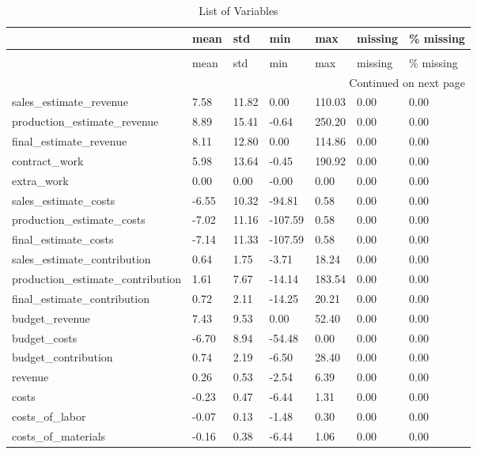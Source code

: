 \begin{landscape}\begin{longtable}[h!]{lllllll}
\caption{List of Variables} \label{eda_1} \\
\toprule
 & mean & std & min & max & missing & \% missing \\
\midrule
\endfirsthead
\caption[]{List of Variables} \\
\toprule
 & mean & std & min & max & missing & \% missing \\
\midrule
\endhead
\midrule
\multicolumn{7}{r}{Continued on next page} \\
\midrule
\endfoot
\bottomrule
\endlastfoot
sales_estimate_revenue & 7.58 & 11.82 & 0.00 & 110.03 & 0.00 & 0.00 \\
production_estimate_revenue & 8.89 & 15.41 & -0.64 & 250.20 & 0.00 & 0.00 \\
final_estimate_revenue & 8.11 & 12.80 & 0.00 & 114.86 & 0.00 & 0.00 \\
contract_work & 5.98 & 13.64 & -0.45 & 190.92 & 0.00 & 0.00 \\
extra_work & 0.00 & 0.00 & -0.00 & 0.00 & 0.00 & 0.00 \\
sales_estimate_costs & -6.55 & 10.32 & -94.81 & 0.58 & 0.00 & 0.00 \\
production_estimate_costs & -7.02 & 11.16 & -107.59 & 0.58 & 0.00 & 0.00 \\
final_estimate_costs & -7.14 & 11.33 & -107.59 & 0.58 & 0.00 & 0.00 \\
sales_estimate_contribution & 0.64 & 1.75 & -3.71 & 18.24 & 0.00 & 0.00 \\
production_estimate_contribution & 1.61 & 7.67 & -14.14 & 183.54 & 0.00 & 0.00 \\
final_estimate_contribution & 0.72 & 2.11 & -14.25 & 20.21 & 0.00 & 0.00 \\
budget_revenue & 7.43 & 9.53 & 0.00 & 52.40 & 0.00 & 0.00 \\
budget_costs & -6.70 & 8.94 & -54.48 & 0.00 & 0.00 & 0.00 \\
budget_contribution & 0.74 & 2.19 & -6.50 & 28.40 & 0.00 & 0.00 \\
revenue & 0.26 & 0.53 & -2.54 & 6.39 & 0.00 & 0.00 \\
costs & -0.23 & 0.47 & -6.44 & 1.31 & 0.00 & 0.00 \\
costs_of_labor & -0.07 & 0.13 & -1.48 & 0.30 & 0.00 & 0.00 \\
costs_of_materials & -0.16 & 0.38 & -6.44 & 1.06 & 0.00 & 0.00 \\

\end{longtable}
\end{landscape}
